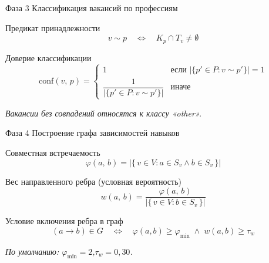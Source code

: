 \documentclass[12pt]{beamer}
\begin{document}
\begin{frame}{Фаза 3 \textendash{} Классификация вакансий по профессиям}

  \begin{block}{Предикат принадлежности}
    \[
      v \sim p \quad\Longleftrightarrow\quad K_p \cap T_v \neq \emptyset
    \]
  \end{block}

  \begin{block}{Доверие классификации}
    \[
      \mathrm{conf}(v,\,p) =
      \begin{cases}
        1
          & \text{если } \bigl|\{p' \in P : v \sim p'\}\bigr| = 1 \\[6pt]
        \dfrac{1}{\bigl|\{p' \in P : v \sim p'\}\bigr|}
          & \text{иначе}
      \end{cases}
    \]
  \end{block}

  \smallskip
  \textit{Вакансии без совпадений относятся к классу «other».}
\end{frame}

\begin{frame}{Фаза 4 \textendash{} Построение графа зависимостей навыков}

  \begin{block}{Совместная встречаемость}
    \[
      \varphi(a,\,b) = \bigl|\{\,v \in V : a \in S_v \wedge b \in S_v\,\}\bigr|
    \]
  \end{block}

  \begin{block}{Вес направленного ребра (условная вероятность)}
    \[
      w(a,\,b) = \frac{\varphi(a,\,b)}
                      {\bigl|\{\,v \in V : b \in S_v\,\}\bigr|}
    \]
  \end{block}

  \begin{block}{Условие включения ребра в граф}
    \[
      (a \to b) \in G \quad\Longleftrightarrow\quad
      \varphi(a,b) \geq \varphi_{\min} \;\wedge\; w(a,b) \geq \tau_w
    \]
  \end{block}

  \smallskip
  \textit{По умолчанию: $\varphi_{\min} = 2$,\quad $\tau_w = 0{,}30$.}
\end{frame}
\end{document}

